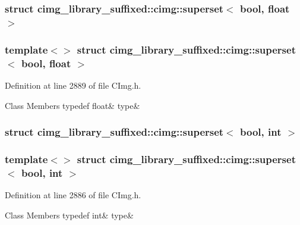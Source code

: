 \subsubsection{struct cimg\+\_\+library\+\_\+suffixed\+:\+:cimg\+:\+:superset$<$ bool, float $>$}
\subsubsection*{template$<$$>$\newline
struct cimg\+\_\+library\+\_\+suffixed\+::cimg\+::superset$<$ bool, float $>$}



Definition at line 2889 of file C\+Img.\+h.

\begin{DoxyFields}{Class Members}
\mbox{\label{namespacecimg__library__suffixed_1_1cimg_aa08032fc0bd77f43b6a14c23c770b82f}} 
typedef float&
type&
\\
\hline

\end{DoxyFields}
\label{structcimg__library__suffixed_1_1cimg_1_1superset_3_01bool_00_01int_01_4}
\subsubsection{struct cimg\+\_\+library\+\_\+suffixed\+:\+:cimg\+:\+:superset$<$ bool, int $>$}
\subsubsection*{template$<$$>$\newline
struct cimg\+\_\+library\+\_\+suffixed\+::cimg\+::superset$<$ bool, int $>$}



Definition at line 2886 of file C\+Img.\+h.

\begin{DoxyFields}{Class Members}
\mbox{\label{namespacecimg__library__suffixed_1_1cimg_a58e3cd58cfe47ea7ed381d7aeebab81b}} 
typedef int&
type&
\\
\hline

\end{DoxyFields}
\label{structcimg__library__suffixed_1_1cimg_1_1superset_3_01bool_00_01short_01_4}
